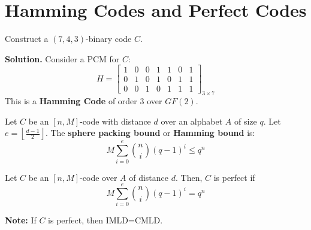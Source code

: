 \section{Hamming Codes and Perfect Codes}

\begin{exbox}
    \begin{example}
        Construct a $ (7,4,3) $-binary code $ C $.

        \textbf{Solution.}
        Consider a PCM for $ C $:
        \[H= \left[
                \begin{array}{ccc|cccc}
                    1 & 0 & 0 & 1 & 1 & 0 & 1 \\
                    0 & 1 & 0 & 1 & 0 & 1 & 1 \\
                    0 & 0 & 1 & 0 & 1 & 1 & 1
                \end{array} \right]_{3\times{} 7} \]
        This is a \textbf{Hamming Code} of order $ 3 $ over $ GF(2) $.
    \end{example}
\end{exbox}

\begin{defbox}
    \begin{definition}
        Let $ C $ be an $ [n,M] $-code with distance $ d $ over an
        alphabet $ A $ of size $ q $. Let $ e=\left\lfloor \frac{d-1}{2} \right\rfloor $.
        The \textbf{sphere packing bound} or \textbf{Hamming bound} is:
        \[ M \sum\limits_{i=0}^{e} \binom{n}{i}(q-1)^i\leqslant q^n \]
    \end{definition} \end{defbox}

\begin{defbox}
    \begin{definition}
        Let $ C $ be an $ [n,M] $-code over $ A $ of distance $ d $. Then,
        $ C $ is perfect if
        \[ M \sum\limits_{i=0}^{e} \binom{n}{i}(q-1)^i = q^n \]
    \end{definition} \end{defbox}

\textbf{Note:} If $ C $ is perfect, then IMLD=CMLD\@.
